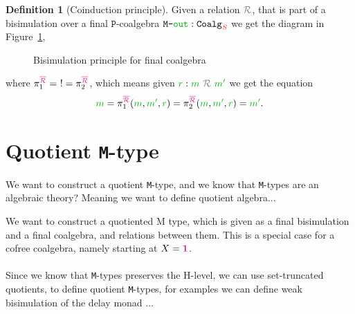 \documentclass[twoside,11pt,openright]{report}
\theoremstyle{plain} %
\theoremstyle{definition}
\newtheorem{defn}{Definition}[section]
\theoremstyle{remark}
\newcommand*{\figref}[1]{Figure~\ref{fig:#1}}
\newcommand*{\term}[1]{\textcolor{green!70!black}{#1}} %
\newcommand*{\type}[1]{\textcolor{magenta!90!black}{#1}}
\newcommand*{\container}[1]{\textcolor{red}{#1}}
\newcommand*{\unit}{\type{\textbf{1}}}
\newcommand*{\coalg}[2]{#1\texttt{-}#2}
\newcommand*{\relation}[1]{\textcolor{gray}{\ensuremath{\mathtt{#1}}}}
\newcommand*{\function}[1]{\textcolor{blue!60!black}{\ensuremath{\mathtt{#1}}}}
\newcommand*{\typeformer}[1]{\ensuremath{\mathtt{#1}}}
\newcommand*{\functor}[1]{\ensuremath{\mathbf{\mathtt{#1}}}}
\begin{document}
\begin{defn}[Coinduction principle]
  \noindent Given a relation \(\relation{\mathcal{R}}\), that is part of a bisimulation over a final \(\functor{P}\)-coalgebra \(\coalg{\typeformer{M}}{\term{\mathtt{out}}}:\mathtt{Coalg}_{\container{S}}\) we get the diagram in \figref{final-coalgebra-coinduction},
  
  \begin{figure}[h]
    \centering
    \caption{Bisimulation principle for final coalgebra}
    \label{fig:final-coalgebra-coinduction}
  \end{figure}
  \noindent where \(\pi_1^{\type{\overline{\mathcal{R}}}} = ~! = \pi_2^{\type{\overline{\mathcal{R}}}}\), which means given \(\term{r} : \term{m}~\relation{\mathcal{R}}~\term{m'}\) we get the equation
  \begin{equation}
    \term{m} = \pi_1^{\type{\overline{\mathcal{R}}}} (\term{m}, \term{m'}, \term{r}) = \pi_2^{\type{\overline{\mathcal{R}}}} (\term{m}, \term{m'}, \term{r}) = \term{m'}.
  \end{equation}
\end{defn}

\section{Quotient \texttt{M}-type}
We want to construct a quotient \texttt{M}-type, and we know that \texttt{M}-types are an algebraic theory? Meaning we want to define quotient algebra...

We want to construct a quotiented M type, which is given as a final bisimulation and a final coalgebra, and relations between them. This is a special case for a cofree coalgebra, namely starting at \(X = \unit\).
\\ \\
Since we know that \texttt{M}-types preserves the H-level, we can use set-truncated quotients, to define quotient \texttt{M}-types, for examples we can define weak bisimulation of the delay monad ...
\end{document}
